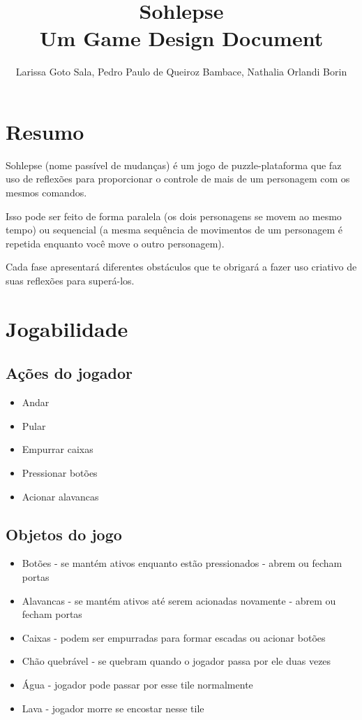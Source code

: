 \documentclass[a4paper, 11pt]{article}
\title{\textbf{Sohlepse} \\ \small{Um Game Design Document}}
\author{Larissa Goto Sala, Pedro Paulo de Queiroz Bambace, Nathalia Orlandi Borin}
\begin{document}
\maketitle

\newpage

\newpage

\section{Resumo}
	
	Sohlepse (nome passível de mudanças) é um jogo de puzzle-plataforma que faz uso de reflexões para proporcionar o controle de mais de um personagem com os mesmos comandos.

Isso pode ser feito de forma paralela (os dois personagens se movem ao mesmo tempo) ou sequencial (a mesma sequência de movimentos de um personagem é repetida enquanto você move o outro personagem).

Cada fase apresentará diferentes obstáculos que te obrigará a fazer uso criativo de suas reflexões para superá-los.

\section{Jogabilidade}

	\subsection{Ações do jogador}
		\begin{itemize}
			\item Andar 
			\item Pular 
			\item Empurrar caixas 
			\item Pressionar botões
			\item Acionar alavancas 
		\end{itemize}

	\subsection{Objetos do jogo}
		\begin{itemize}
			\item Botões - se mantém ativos enquanto estão pressionados - abrem ou fecham portas
			\item Alavancas - se mantém ativos até serem acionadas novamente - abrem ou fecham portas
			\item Caixas - podem ser empurradas para formar escadas ou acionar botões
			\item Chão quebrável - se quebram quando o jogador passa por ele duas vezes
			\item Água - jogador pode passar por esse tile normalmente
			\item Lava - jogador morre se encostar nesse tile
		\end{itemize}
\end{document}
